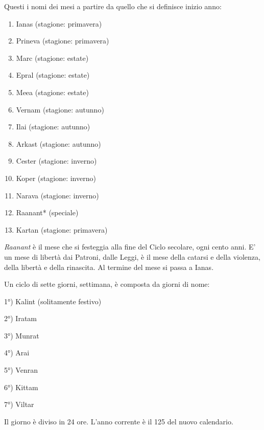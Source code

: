 \documentclass[landscape,10pt,a4paper]{article}
\begin{document}
\begin{multicols}{3}
\begin{dmbox}[title=Modificatori d'Attacco e Difesa - pagina \pageref{modificatoriattaccodifesaparticolari}]
\end{dmbox}

\begin{dmbox}[title=Il calendario \pageref{il-calendario}]

Questi i nomi dei mesi a partire da quello che si definisce inizio anno:

\begin{enumerate}
	\item Ianas (stagione: primavera)
	\item Prineva (stagione: primavera)
	\item Marc (stagione: estate)
	\item Epral (stagione: estate)
	\item Meea (stagione: estate)
	\item Vernam (stagione: autunno)
	\item Ilai (stagione: autunno)
	\item Arkast (stagione: autunno)
	\item Cester (stagione: inverno)
	\item Koper (stagione: inverno)
	\item Narava (stagione: inverno)
	\item Raanant* (speciale)
	\item Kartan (stagione: primavera)
\end{enumerate}


\medskip

\emph{Raanant} è il mese che si festeggia alla fine del Ciclo secolare, ogni cento anni. E' un mese di libertà dai Patroni, dalle Leggi, è il mese della catarsi e della violenza, della libertà e della rinascita. Al termine del mese si passa a Ianas.

\medskip

Un ciclo di sette giorni, settimana, è composta da giorni di nome:

\medskip

1°) Kalint (solitamente festivo)

2°) Iratam

3°) Munrat

4°) Arai

5°) Venran

6°) Kittam

7°) Viltar

\medskip

Il giorno è diviso in 24 ore. L'anno corrente è il 125 del nuovo calendario.

\end{dmbox}

\end{multicols}
\end{document}
